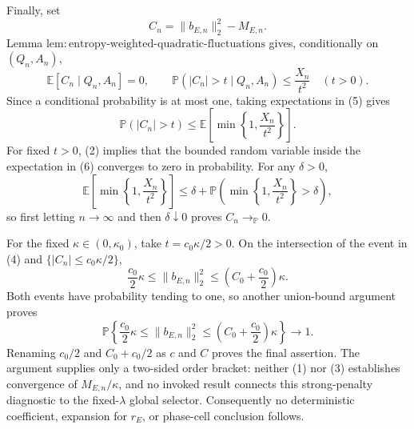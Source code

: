 Finally, set
\[
 C_n=\|b_{E,n}\|_2^2-M_{E,n}.
\]
Lemma \(\mathrm{lem{:}entropy\mbox{-}weighted\mbox{-}quadratic\mbox{-}fluctuations}\) gives, conditionally on \((Q_n,A_n)\),
\[
 \mathbb E[C_n\mid Q_n,A_n]=0,
 \qquad
 \mathbb P(|C_n|>t\mid Q_n,A_n)\le \frac{X_n}{t^2}
 \quad(t>0).
 \tag{5}
\]
Since a conditional probability is at most one, taking expectations in (5) gives
\[
 \mathbb P(|C_n|>t)
 \le \mathbb E\!\left[\min\left\{1,\frac{X_n}{t^2}\right\}\right].
 \tag{6}
\]
For fixed \(t>0\), (2) implies that the bounded random variable inside the expectation in (6) converges to zero in probability.  For any \(\delta>0\),
\[
 \mathbb E\!\left[\min\left\{1,\frac{X_n}{t^2}\right\}\right]
 \le \delta+
 \mathbb P\!\left(\min\left\{1,\frac{X_n}{t^2}\right\}>\delta\right),
\]
so first letting \(n\to\infty\) and then \(\delta\downarrow0\) proves \(C_n\to_{\mathbb P}0\).

For the fixed \(\kappa\in(0,\kappa_0)\), take \(t=c_0\kappa/2>0\).  On the intersection of the event in (4) and \(\{|C_n|\le c_0\kappa/2\}\),
\[
 \frac{c_0}{2}\kappa
 \le \|b_{E,n}\|_2^2
 \le \left(C_0+\frac{c_0}{2}\right)\kappa.
\]
Both events have probability tending to one, so another union-bound argument proves
\[
 \mathbb P\!\left\{
  \frac{c_0}{2}\kappa\le\|b_{E,n}\|_2^2
  \le\left(C_0+\frac{c_0}{2}\right)\kappa
 \right\}\longrightarrow1.
\]
Renaming \(c_0/2\) and \(C_0+c_0/2\) as \(c\) and \(C\) proves the final assertion.  The argument supplies only a two-sided order bracket: neither (1) nor (3) establishes convergence of \(M_{E,n}/\kappa\), and no invoked result connects this strong-penalty diagnostic to the fixed-\(\lambda\) global selector.  Consequently no deterministic coefficient, expansion for \(r_E\), or phase-cell conclusion follows.
